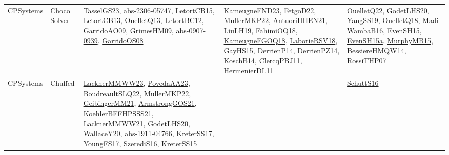 {\begin{longtable}{lp{3cm}>{\raggedright}p{6cm}>{\raggedright}p{6cm}p{8cm}}
CPSystems & Choco Solver & \href{papers/TasselGS23.pdf}{TasselGS23}\cite{TasselGS23}, \href{articles/abs-2306-05747.pdf}{abs-2306-05747}\cite{abs-2306-05747}, \href{articles/LetortCB15.pdf}{LetortCB15}\cite{LetortCB15}, \href{papers/LetortCB13.pdf}{LetortCB13}\cite{LetortCB13}, \href{papers/OuelletQ13.pdf}{OuelletQ13}\cite{OuelletQ13}, \href{papers/LetortBC12.pdf}{LetortBC12}\cite{LetortBC12}, \href{articles/GarridoAO09.pdf}{GarridoAO09}\cite{GarridoAO09}, \href{papers/GrimesHM09.pdf}{GrimesHM09}\cite{GrimesHM09}, \href{articles/abs-0907-0939.pdf}{abs-0907-0939}\cite{abs-0907-0939}, \href{articles/GarridoOS08.pdf}{GarridoOS08}\cite{GarridoOS08} & \href{papers/KameugneFND23.pdf}{KameugneFND23}\cite{KameugneFND23}, \href{articles/FetgoD22.pdf}{FetgoD22}\cite{FetgoD22}, \href{articles/MullerMKP22.pdf}{MullerMKP22}\cite{MullerMKP22}, \href{papers/AntuoriHHEN21.pdf}{AntuoriHHEN21}\cite{AntuoriHHEN21}, \href{papers/LiuLH19.pdf}{LiuLH19}\cite{LiuLH19}, \href{articles/FahimiOQ18.pdf}{FahimiOQ18}\cite{FahimiOQ18}, \href{papers/KameugneFGOQ18.pdf}{KameugneFGOQ18}\cite{KameugneFGOQ18}, \href{articles/LaborieRSV18.pdf}{LaborieRSV18}\cite{LaborieRSV18}, \href{papers/GayHS15.pdf}{GayHS15}\cite{GayHS15}, \href{papers/DerrienP14.pdf}{DerrienP14}\cite{DerrienP14}, \href{papers/DerrienPZ14.pdf}{DerrienPZ14}\cite{DerrienPZ14}, \href{papers/KoschB14.pdf}{KoschB14}\cite{KoschB14}, \href{papers/ClercqPBJ11.pdf}{ClercqPBJ11}\cite{ClercqPBJ11}, \href{papers/HermenierDL11.pdf}{HermenierDL11}\cite{HermenierDL11} & \href{papers/OuelletQ22.pdf}{OuelletQ22}\cite{OuelletQ22}, \href{papers/GodetLHS20.pdf}{GodetLHS20}\cite{GodetLHS20}, \href{papers/YangSS19.pdf}{YangSS19}\cite{YangSS19}, \href{papers/OuelletQ18.pdf}{OuelletQ18}\cite{OuelletQ18}, \href{papers/Madi-WambaB16.pdf}{Madi-WambaB16}\cite{Madi-WambaB16}, \href{papers/EvenSH15.pdf}{EvenSH15}\cite{EvenSH15}, \href{articles/EvenSH15a.pdf}{EvenSH15a}\cite{EvenSH15a}, \href{papers/MurphyMB15.pdf}{MurphyMB15}\cite{MurphyMB15}, \href{papers/BessiereHMQW14.pdf}{BessiereHMQW14}\cite{BessiereHMQW14}, \href{papers/RossiTHP07.pdf}{RossiTHP07}\cite{RossiTHP07}\\
CPSystems & Chuffed & \href{articles/LacknerMMWW23.pdf}{LacknerMMWW23}\cite{LacknerMMWW23}, \href{papers/PovedaAA23.pdf}{PovedaAA23}\cite{PovedaAA23}, \href{papers/BoudreaultSLQ22.pdf}{BoudreaultSLQ22}\cite{BoudreaultSLQ22}, \href{articles/MullerMKP22.pdf}{MullerMKP22}\cite{MullerMKP22}, \href{papers/GeibingerMM21.pdf}{GeibingerMM21}\cite{GeibingerMM21}, \href{papers/ArmstrongGOS21.pdf}{ArmstrongGOS21}\cite{ArmstrongGOS21}, \href{articles/KoehlerBFFHPSSS21.pdf}{KoehlerBFFHPSSS21}\cite{KoehlerBFFHPSSS21}, \href{papers/LacknerMMWW21.pdf}{LacknerMMWW21}\cite{LacknerMMWW21}, \href{papers/GodetLHS20.pdf}{GodetLHS20}\cite{GodetLHS20}, \href{articles/WallaceY20.pdf}{WallaceY20}\cite{WallaceY20}, \href{articles/abs-1911-04766.pdf}{abs-1911-04766}\cite{abs-1911-04766}, \href{articles/KreterSS17.pdf}{KreterSS17}\cite{KreterSS17}, \href{papers/YoungFS17.pdf}{YoungFS17}\cite{YoungFS17}, \href{papers/SzerediS16.pdf}{SzerediS16}\cite{SzerediS16}, \href{papers/KreterSS15.pdf}{KreterSS15}\cite{KreterSS15} &  & \href{papers/SchuttS16.pdf}{SchuttS16}\cite{SchuttS16}\\

\end{longtable}}
